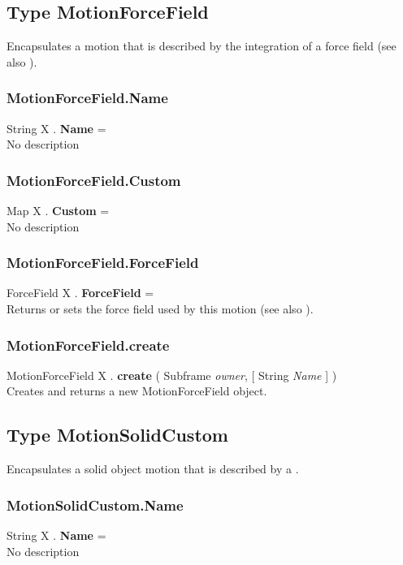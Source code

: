 \subsection{Type MotionForceField \label{T:MotionForceField}}
Encapsulates a motion that is described by the integration of a force field (see also ).


\subsubsection{MotionForceField.Name \label{F:MotionForceField:Name}}
String X . \textbf{Name} = \\
No description

\subsubsection{MotionForceField.Custom \label{F:MotionForceField:Custom}}
Map X . \textbf{Custom} = \\
No description

\subsubsection{MotionForceField.ForceField \label{F:MotionForceField:ForceField}}
ForceField X . \textbf{ForceField} = \\
Returns or sets the force field used by this motion (see also ).

\subsubsection{MotionForceField.create \label{F:MotionForceField:create}}
MotionForceField X . \textbf{create} ( Subframe \textit{owner},  [ String \textit{Name} ] ) \\
Creates and returns a new MotionForceField object.


\subsection{Type MotionSolidCustom \label{T:MotionSolidCustom}}
Encapsulates a solid object motion that is described by a .

\subsubsection{MotionSolidCustom.Name \label{F:MotionSolidCustom:Name}}
String X . \textbf{Name} = \\
No description

